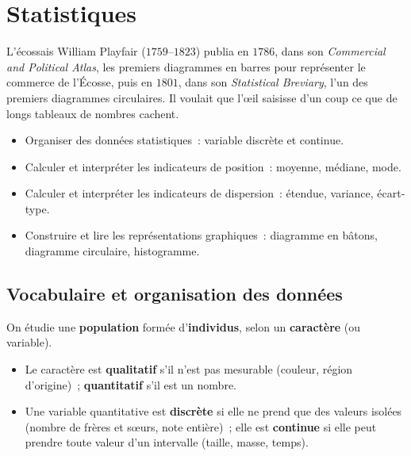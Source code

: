 \chapter{Statistiques}


\begin{anecdote}
L'\'ecossais William Playfair ($1759$--$1823$) publia en $1786$, dans son
\textit{Commercial and Political Atlas}, les premiers diagrammes en barres pour
repr\'esenter le commerce de l'\'Ecosse, puis en $1801$, dans son
\textit{Statistical Breviary}, l'un des premiers diagrammes circulaires.
Il voulait que l'\oe il saisisse d'un coup ce que de longs tableaux de nombres cachent.
\end{anecdote}

\begin{objectifs}
\begin{itemize}
  \item Organiser des donn\'ees statistiques~: variable discr\`ete et continue.
  \item Calculer et interpr\'eter les indicateurs de position~:
        moyenne, m\'ediane, mode.
  \item Calculer et interpr\'eter les indicateurs de dispersion~:
        \'etendue, variance, \'ecart-type.
  \item Construire et lire les repr\'esentations graphiques~:
        diagramme en b\^atons, diagramme circulaire, histogramme.
\end{itemize}
\end{objectifs}

\section{Vocabulaire et organisation des donn\'ees}

\begin{defn}
On \'etudie une \textbf{population} form\'ee d'\textbf{individus}, selon un
\textbf{caract\`ere} (ou variable).
\begin{itemize}
  \item Le caract\`ere est \textbf{qualitatif} s'il n'est pas mesurable
        (couleur, r\'egion d'origine)~; \textbf{quantitatif} s'il est un nombre.
  \item Une variable quantitative est \textbf{discr\`ete} si elle ne prend que des
        valeurs isol\'ees (nombre de fr\`eres et s\oe urs, note enti\`ere)~;
        elle est \textbf{continue} si elle peut prendre toute valeur d'un
        intervalle (taille, masse, temps).
\end{itemize}
\end{defn}

